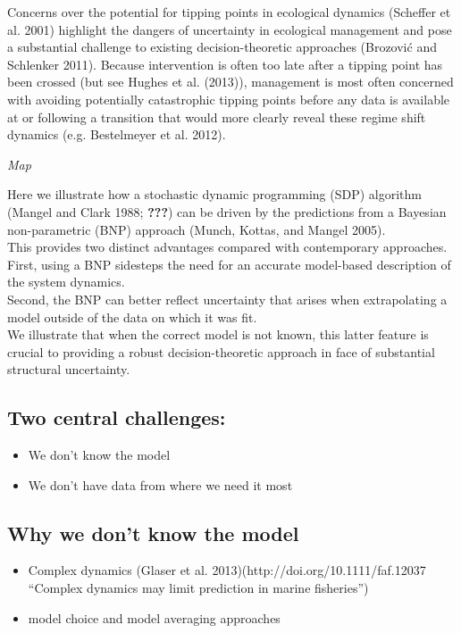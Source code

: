 \documentclass[author-year, review]{elsarticle} %
\begin{document}
Concerns over the potential for tipping points in ecological dynamics
(Scheffer et al. 2001) highlight the dangers of uncertainty in
ecological management and pose a substantial challenge to existing
decision-theoretic approaches (Brozović and Schlenker 2011). Because
intervention is often too late after a tipping point has been crossed
(but see Hughes et al. (2013)), management is most often concerned with
avoiding potentially catastrophic tipping points before any data is
available at or following a transition that would more clearly reveal
these regime shift dynamics (e.g. Bestelmeyer et al. 2012).

\emph{Map}

Here we illustrate how a stochastic dynamic programming (SDP) algorithm
(Mangel and Clark 1988; {\textbf{???}}) can be driven by the predictions
from a Bayesian non-parametric (BNP) approach (Munch, Kottas, and Mangel
2005).\\This provides two distinct advantages compared with contemporary
approaches. First, using a BNP sidesteps the need for an accurate
model-based description of the system dynamics.\\Second, the BNP can
better reflect uncertainty that arises when extrapolating a model
outside of the data on which it was fit.\\We illustrate that when the
correct model is not known, this latter feature is crucial to providing
a robust decision-theoretic approach in face of substantial structural
uncertainty.

\subsection{Two central challenges:}\label{two-central-challenges}

\begin{itemize}
\itemsep1pt\parskip0pt
\item
  We don't know the model
\item
  We don't have data from where we need it most
\end{itemize}

\subsection{Why we don't know the
model}\label{why-we-dont-know-the-model}

\begin{itemize}
\item
  Complex dynamics (Glaser et al. 2013)(http://doi.org/10.1111/faf.12037
  ``Complex dynamics may limit prediction in marine fisheries'')
\item
  model choice and model averaging approaches
\end{itemize}
\end{document}
